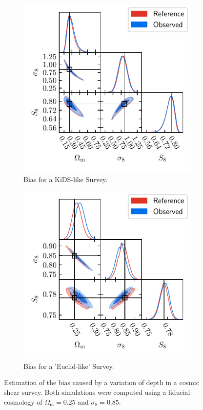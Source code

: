 \documentclass[referee]{aa} %
\renewcommand{\[}{\begin{equation}}
\renewcommand{\]}{\end{equation}}
\renewcommand{\rm}{\mathrm}
\begin{document}
\begin{figure}
\begin{subfigure}{0.5\textwidth}
	\includegraphics[width=\textwidth]{images/mcmc_kids.pdf}
	\caption{Bias for a KiDS-like Survey.}
	\label{fig:mcmc_kids}
\end{subfigure}
\begin{subfigure}{0.5\textwidth}
	\includegraphics[width=\textwidth]{images/mcmc_euclid.pdf}
	\caption{Bias for a 'Euclid-like' Survey.}
	\label{fig:mcmc_euclid}
\end{subfigure}
\caption{Estimation of the bias caused by a variation of depth in a cosmic shear survey. Both simulations were computed using a fiducial cosmology of $\Omega_{\rm{m}}=0.25$ and $\sigma_8 = 0.85$.}
\end{figure} 
\end{document}
